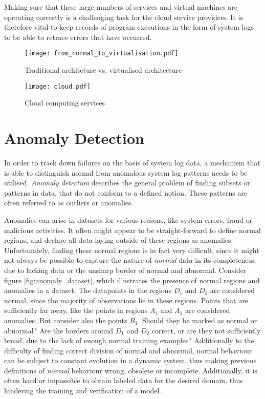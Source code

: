 Making sure that these large numbers of services and virtual machines are operating correctly is a challenging task for the cloud service providers. It is therefore vital to keep records of program executions in the form of system logs to be able to retrace errors that have occurred.

\begin{figure}[h]
  \centering
  \texttt{[image: from\_normal\_to\_virtualisation.pdf]}\\
  \caption{Traditional architeture vs. virtualised architecture}
  \label{fig:virtualisation}
\end{figure}

\begin{figure}[H]
  \centering
  \texttt{[image: cloud.pdf]}\\
  \caption{Cloud computing services}
  \label{fig:cloud}
\end{figure}


\section{Anomaly Detection \label{sec:anomaly-detection}}
In order to track down failures on the basis of system log data, a mechanism that is able to distinguish normal from anomalous system log patterns needs to be utilised.
\textit{Anomaly detection} describes the general problem of finding subsets or patterns in data, that do not conform to a defined notion. These patterns are often referred to as outliers or anomalies.

Anomalies can arise in datasets for various reasons, like system errors, fraud or malicious activities. It often might appear to be straight-forward to define normal regions, and declare all data laying outside of these regions as anomalies. Unfortunately, finding these normal regions is in fact very difficult, since it might not always be possible to capture the nature of \textit{normal} data in its completeness, due to lacking data or the unsharp border of normal and abnormal. Consider figure \ref{fig:anomaly_dataset}, which illustrates the presence of normal regions and anomalies in a dataset. The datapoints in the regions $D_1$ and $D_2$ are considered normal, since the majority of observations lie in these regions. Points that are sufficiently far away, like the points in regions $A_1$ and $A_2$ are considered anomalies. But consider also the points $B_1$. Should they be marked as normal or abnormal? Are the borders around $D_1$ and $D_2$ correct, or are they not sufficiently broad, due to the lack of enough normal training examples? 
Additionally to the difficulty of finding correct division of normal and abnormal, normal behaviour can be subject to constant evolution in a dynamic system, thus making previous definitions of \textit{normal} behaviour wrong, obsolete or incomplete. Additionally, it is often hard or impossible to obtain labeled data for the desired domain, thus hindering the training and verification of a model \cite{chandola2009anomaly}.

